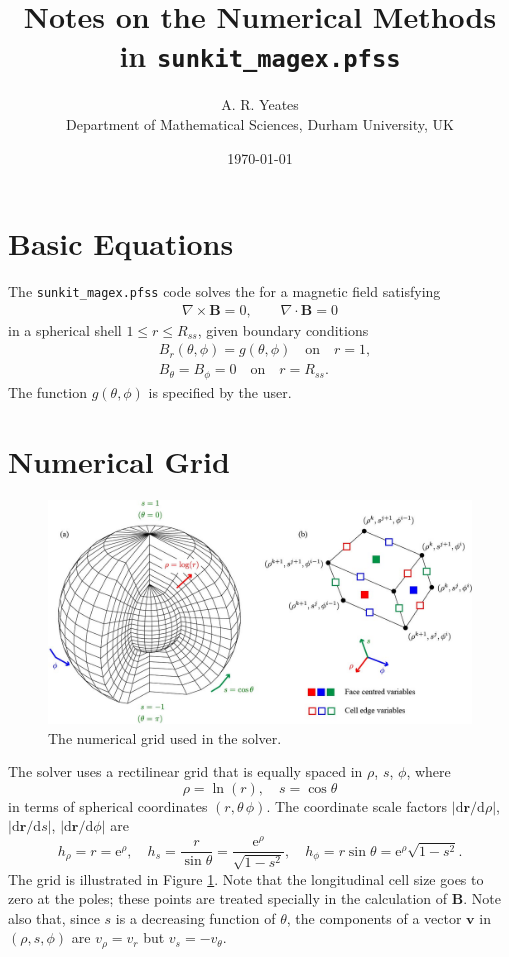 \documentclass[11pt]{article}
\title{Notes on the Numerical Methods in \texttt{sunkit_magex.pfss}}
\author{A. R. Yeates\\ Department of Mathematical Sciences, Durham University, UK}
\date{\today}
\newcommand{\Bb}{\boldsymbol{B}}
\begin{document}
\maketitle

\section{Basic Equations}

The \texttt{sunkit_magex.pfss} code solves the for a magnetic field satisfying
\begin{align}
\nabla\times\Bb=0,\qquad
\nabla\cdot\Bb = 0
\end{align}
in a spherical shell $1 \leq r \leq R_{ss}$, given boundary conditions
\begin{align}
&B_r(\theta,\phi) = g(\theta,\phi) \quad \textrm{on} \quad r=1,\\
&B_\theta=B_\phi=0 \quad \textrm{on} \quad r=R_{ss}. \label{eqn:bc1}
\end{align}
The function $g(\theta,\phi)$ is specified by the user.

\section{Numerical Grid}

\begin{figure}
\includegraphics[width=\textwidth]{grid.jpg}
\caption{The numerical grid used in the solver.}
\label{fig:grid}
\end{figure}

The solver uses a rectilinear grid that is equally spaced in $\rho$, $s$, $\phi$, where
\[
\rho = \ln(r), \quad s=\cos\theta
\]
in terms of spherical coordinates $(r,\theta\,\phi)$. The coordinate scale factors $|\mathrm{d}\boldsymbol r/\mathrm{d}\rho|$, $|\mathrm{d}\boldsymbol r/\mathrm{d}s|$, $|\mathrm{d}\boldsymbol r/\mathrm{d}\phi|$ are
\[
h_\rho = r = \mathrm{e}^\rho,\quad h_s = \frac{r}{\sin\theta} = \frac{\mathrm{e}^\rho}{\sqrt{1-s^2}}, \quad h_\phi = r\sin\theta = \mathrm{e}^\rho\sqrt{1-s^2}.
\]
The grid is illustrated in Figure \ref{fig:grid}. Note that the longitudinal cell size goes to zero at the poles; these points are treated specially in the calculation of $\Bb$. Note also that, since $s$ is a decreasing function of $\theta$, the components of a vector $\boldsymbol{v}$ in $(\rho,s,\phi)$ are $v_\rho = v_r$ but $v_s = -v_\theta$.
\end{document}
